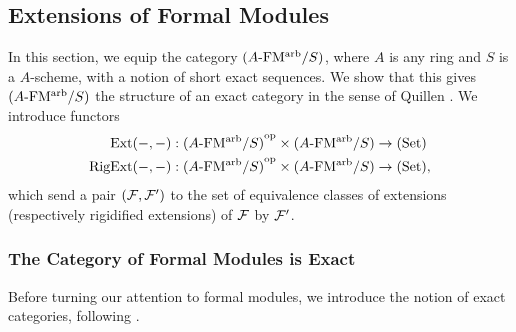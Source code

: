 \documentclass[../main.tex]{subfiles}
\begin{document}
\subsection{Extensions of Formal Modules} %
\label{sub:Exact Categories Extensions of Formal Modules}

In this section, we equip the category ${({A}\textnormal-\allowbreak\mathrm{FM^{arb}}/{S})}$, where 
$A$ is any ring and $S$ is a $A$-scheme,
with a notion of short exact sequences. We show that this gives ${({A}\textnormal-\allowbreak\mathrm{FM^{arb}}/{S})}$ 
the structure of an exact category in the sense of 
Quillen \cite[Appendix A]{keller1990chain}. We introduce functors
\begin{align*}
  \operatorname{Ext}(-,-)&: {({A}\textnormal-\allowbreak\mathrm{FM^{arb}}/{S})}^{\mathrm{op}} \times {({A}\textnormal-\allowbreak\mathrm{FM^{arb}}/{S})} \to {(\mathrm{Set})} \\
  \operatorname {RigExt}(-,-)&: {({A}\textnormal-\allowbreak\mathrm{FM^{arb}}/{S})}^{\mathrm{op}} \times {({A}\textnormal-\allowbreak\mathrm{FM^{arb}}/{S})} \to {(\mathrm{Set})},
\end{align*}
which send a pair $(\mathcal{F}, \mathcal{F}')$ to the set of equivalence classes of 
extensions (respectively rigidified extensions) of $\mathcal{F}$ by $\mathcal{F}'$. 

\subsubsection{The Category of Formal Modules is Exact} %
\label{ssub:The Category of Formal Modules is Exact}
Before turning our attention to formal modules, we introduce the notion of 
exact categories, following \cite[Appendix A]{keller1990chain}.
\end{document}
